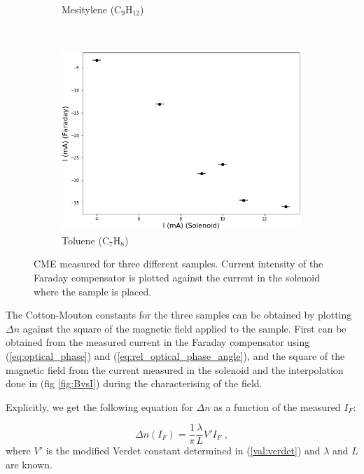 \documentclass[11pt,a4paper]{article}
\begin{document}
\begin{figure}[H]
\begin{subfigure}[b]{0.45\textwidth}
\caption{Mesitylene (C$_9$H$_{12}$)}
\label{fig:CME_sample2}
\end{subfigure}\\\vspace{.2cm}
\begin{subfigure}[b]{0.45\textwidth}
\includegraphics[width=\textwidth]{sample1}
\caption{Toluene (C$_7$H$_8$)}
\label{fig:CME_sample1}
\end{subfigure}
\caption{CME measured for three different samples. Current intensity of the Faraday compensator is plotted against the current in the solenoid where the sample is placed.}
\label{fig:CME}
\end{figure}

The Cotton-Mouton constants for the three samples can be obtained by plotting $\Delta n$ against the square of the magnetic field applied to the sample. First can be obtained from the measured current in the Faraday compensator using (\ref{eq:optical_phase}) and (\ref{eq:rel_optical_phase_angle}), and the square of the magnetic field from the current measured in the solenoid and the interpolation done in (fig \ref{fig:BvsI}) during the characterising of the field.

Explicitly, we get the following equation for $\Delta n$ as a function of the measured $I_F$:

\begin{equation}\label{eq:delta_n}
\Delta n(I_F)=\frac{1}{\pi}\frac{\lambda}{L}V'I_F\;,
\end{equation}
where $V'$ is the modified Verdet constant determined in (\ref{val:verdet}) and $\lambda$ and $L$ are known.
\end{document}
